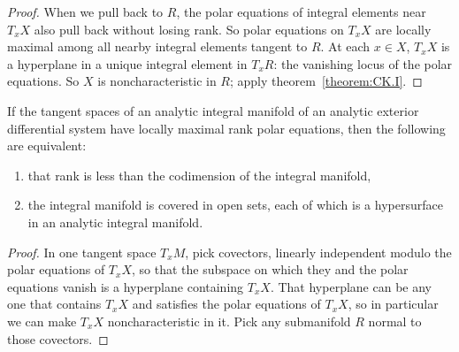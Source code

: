 \begin{proof}
When we pull back to \(R\), the polar equations of integral elements  near \(T_x X\) also pull back without losing rank.
So polar equations on \(T_x X\) are locally maximal among all nearby integral elements tangent to \(R\).
At each \(x\in X\), \(T_x X\) is a hyperplane in a unique integral element in \(T_x R\): the vanishing locus of the polar equations.
So \(X\) is noncharacteristic in \(R\); apply theorem~\vref{theorem:CK.I}.
\end{proof}
\begin{corollary}\label{corollary:local.CK}
If the tangent spaces of an analytic integral manifold of an analytic exterior differential system have locally maximal rank polar equations, then the following are equivalent:
\begin{enumerate}
\item that rank is less than the codimension of the integral manifold,
\item the integral manifold is covered in open sets, each of which is a hypersurface in an analytic integral manifold.
\end{enumerate}
\end{corollary}
\begin{proof}
In one tangent space \(T_x M\), pick covectors, linearly independent modulo the polar equations of \(T_x X\), so that the subspace on which they and the polar equations vanish is a hyperplane containing \(T_x X\).
That hyperplane can be any one that contains \(T_x X\) and satisfies the polar equations of \(T_x X\), so in particular we can make \(T_x X\) noncharacteristic in it.
Pick any submanifold \(R\) normal to those covectors.
\end{proof}

